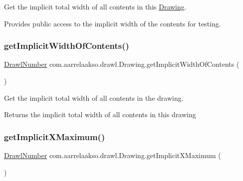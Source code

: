 Get the implicit total width of all contents in this \hyperlink{classcom_1_1aarrelaakso_1_1drawl_1_1_drawing}{Drawing}. 

Provides public access to the implicit width of the contents for testing. \mbox{\label{classcom_1_1aarrelaakso_1_1drawl_1_1_drawing_a8e2e3b749b0b3714e0e7a25d71b02e93}} 
\subsubsection{\texorpdfstring{get\+Implicit\+Width\+Of\+Contents()}{getImplicitWidthOfContents()}}
{\footnotesize\ttfamily \hyperlink{classcom_1_1aarrelaakso_1_1drawl_1_1_drawl_number}{Drawl\+Number} com.\+aarrelaakso.\+drawl.\+Drawing.\+get\+Implicit\+Width\+Of\+Contents (\begin{DoxyParamCaption}{ }\end{DoxyParamCaption})\hspace{0.3cm}{\ttfamily [private]}}



Get the implicit total width of all contents in the drawing. 

\begin{DoxyReturn}{Returns}
the implicit total width of all contents in this drawing 
\end{DoxyReturn}
\mbox{\label{classcom_1_1aarrelaakso_1_1drawl_1_1_drawing_abc22e4c627cf1d542b1278d22b388afb}} 
\subsubsection{\texorpdfstring{get\+Implicit\+X\+Maximum()}{getImplicitXMaximum()}}
{\footnotesize\ttfamily \hyperlink{classcom_1_1aarrelaakso_1_1drawl_1_1_drawl_number}{Drawl\+Number} com.\+aarrelaakso.\+drawl.\+Drawing.\+get\+Implicit\+X\+Maximum (\begin{DoxyParamCaption}{ }\end{DoxyParamCaption})\hspace{0.3cm}{\ttfamily [private]}}



